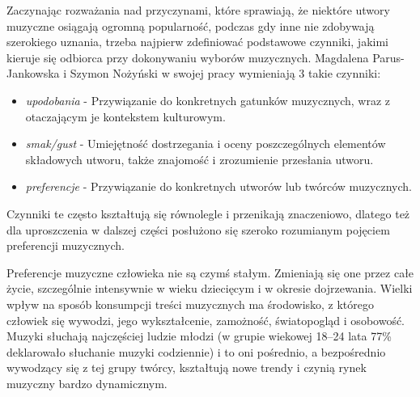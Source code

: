 \documentclass[a4paper,11pt]{article}
\begin{document}
    Zaczynając rozważania nad przyczynami, które sprawiają, że niektóre utwory muzyczne osiągają ogromną popularność, podczas gdy inne nie zdobywają szerokiego uznania, trzeba najpierw zdefiniować podstawowe czynniki, jakimi kieruje się odbiorca przy dokonywaniu wyborów muzycznych. Magdalena Parus-Jankowska i Szymon Nożyński w swojej pracy\cite{PreferencjeMuzyczneWCzasachSteamingu2020} wymieniają 3 takie czynniki:
    \begin{itemize}
        \item \textit{upodobania} - Przywiązanie do konkretnych gatunków muzycznych, wraz z otaczającym je kontekstem kulturowym.
        \item \textit{smak/gust} - Umiejętność dostrzegania i oceny poszczególnych elementów składowych utworu, także znajomość i zrozumienie przesłania utworu.
        \item \textit{preferencje} - Przywiązanie do konkretnych utworów lub twórców muzycznych.
    \end{itemize}
    \smallskip
    Czynniki te często kształtują się równolegle i przenikają znaczeniowo, dlatego też dla uproszczenia w dalszej części posłużono się szeroko rozumianym pojęciem preferencji muzycznych.

    \bigskip

    Preferencje muzyczne człowieka nie są czymś stałym. Zmieniają się one przez całe życie, szczególnie intensywnie w wieku dziecięcym i w okresie dojrzewania\cite{PreferencjeMuzyczneWCzasachSteamingu2020}. Wielki wpływ na sposób konsumpcji treści muzycznych ma środowisko, z którego człowiek się wywodzi, jego wykształcenie, zamożność, światopogląd i osobowość\cite{PreferencjeMuzyczneWCzasachSteamingu2020}. Muzyki słuchają najczęściej ludzie młodzi (w grupie wiekowej 18--24 lata 77\% deklarowało słuchanie muzyki codziennie\cite{cbos2018}) i to oni pośrednio, a bezpośrednio wywodzący się z tej grupy twórcy, kształtują nowe trendy i czynią rynek muzyczny bardzo dynamicznym.

    \bigskip
\end{document}
